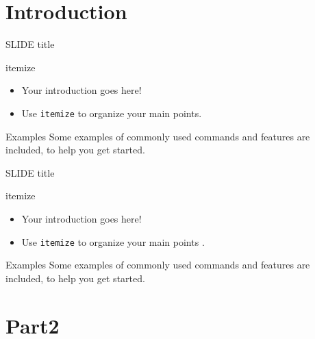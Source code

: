 \documentclass{beamer}
\begin{document}
\section{Introduction}

\begin{frame}{SLIDE title}

\begin{block}{itemize}
\begin{itemize}
  \item Your introduction goes here!
  \item Use \texttt{itemize} to organize your main points.
\end{itemize}
\end{block}
 
\begin{block}{Examples}
Some examples of commonly used commands and features are included, to help you get started.
\end{block}

\end{frame}

 
\begin{frame}{SLIDE title}

\begin{block}{itemize}
\begin{itemize}
  \item Your introduction goes here!
  \item Use \texttt{itemize} to organize your main points \cite{Johnson}.
\end{itemize}
\end{block}
 
\begin{block}{Examples}
Some examples of commonly used commands and features are included, to help you get started.
\end{block}

\end{frame}


\section{Part2}
\end{document}
